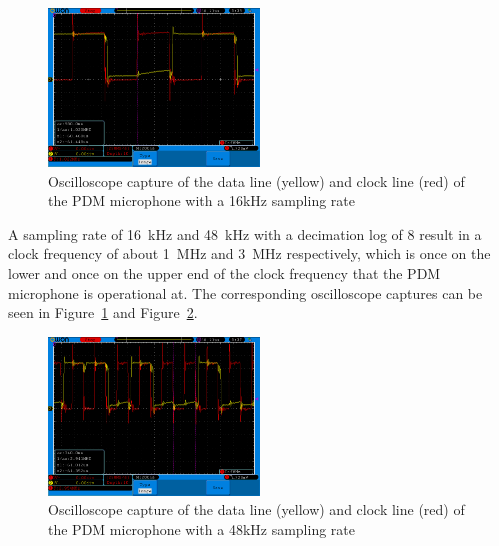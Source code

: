\begin{figure}[H]
    \begin{center}
        \includegraphics[width=0.5\textwidth]{figures/16k_1mhz_sine.png}
    \end{center}
    \caption[Oscilloscope capture of the data line (yellow) and clock line (red) of the PDM microphone with a 16kHz sampling rate]{Oscilloscope capture of the data line (yellow) and clock line (red) of the PDM microphone with a 16kHz sampling rate}
    \label{fig:pdm_16k}
\end{figure}

A sampling rate of \SI{16}{\kilo\hertz} and \SI{48}{\kilo\hertz} with a decimation log of 8
result in a clock frequency of about \SI{1}{\mega\hertz} and \SI{3}{\mega\hertz} respectively,
which is once on the lower and once on the upper end of the clock frequency that the PDM
microphone is operational at.
The corresponding oscilloscope captures can be seen in Figure~\ref{fig:pdm_16k} and Figure~\ref{fig:pdm_48k}.

\begin{figure}[H]
    \begin{center}
        \includegraphics[width=0.5\textwidth]{figures/48k_3mhz_sine.png}
    \end{center}
    \caption[Oscilloscope capture of the data line (yellow) and clock line (red) of the PDM microphone with a 48kHz sampling rate]{Oscilloscope capture of the data line (yellow) and clock line (red) of the PDM microphone with a 48kHz sampling rate}
    \label{fig:pdm_48k}
\end{figure}

